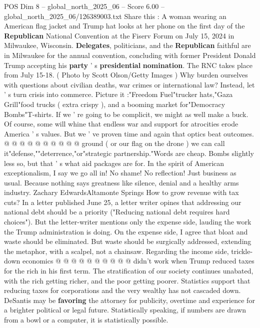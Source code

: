 \begin{textsample}{POS Dim 8 – global\_north\_2025\_06 – Score 6.00 – global\_north\_2025\_06/126389003.txt}  \label{ex:f8_pos_435}
Share this : A woman wearing an American flag jacket and Trump hat looks at her phone on the first day of the \textbf{Republican} National Convention at the Fiserv Forum on July 15, 2024 in Milwaukee, Wisconsin. \textbf{Delegates}, politicians, and the \textbf{Republican} faithful are in Milwaukee for the annual convention, concluding with former President Donald Trump accepting his \textbf{party} ' s \textbf{presidential} \textbf{nomination}.
The RNC takes place from July 15-18. ( Photo by Scott Olson/Getty Images ) Why burden ourselves with questions about civilian deaths, war crimes or international law?
Instead, let ' s turn crisis into commerce.
Picture it :"Freedom Fuel"trucker hats,"Gaza Grill"food trucks ( extra crispy ), and a booming market for"Democracy Bombs"T-shirts.
If we ' re going to be complicit, we might as well make a buck.
Of course, some will whine that endless war and support for atrocities erode America ' s values.
But we ' ve proven time and again that optics beat outcomes. @ @ @ @ @ @ @ @ @ @ ground ( or our flag on the drone ) we can call it"defense,""deterrence,"or"strategic partnership."Words are cheap.
Bombs slightly less so, but that ' s what aid packages are for.
In the spirit of American exceptionalism, I say we go all in!
No shame!
No reflection!
Just business as usual.
Because nothing says greatness like silence, denial and a healthy arms industry.
Zachary EdwardsAltamonte Springs How to grow revenue with tax cuts?
In a letter published June 25, a letter writer opines that addressing our national debt should be a priority ("Reducing national debt requires hard choices").
But the letter-writer mentions only the expense side, lauding the work the Trump administration is doing.
On the expense side, I agree that bloat and waste should be eliminated.
But waste should be surgically addressed, extending the metaphor, with a scalpel, not a chainsaw.
Regarding the income side, trickle-down economics @ @ @ @ @ @ @ @ @ @ didn't work when Trump reduced taxes for the rich in his first term.
The stratification of our society continues unabated, with the rich getting richer, and the poor getting poorer.
Statistics support that reducing taxes for corporations and the very wealthy has not cascaded down.
DeSantis may be \textbf{favoring} the attorney for publicity, overtime and experience for a brighter political or legal future.
Statistically speaking, if numbers are drawn from a bowl or a computer, it is statistically possible.

\end{textsample}
